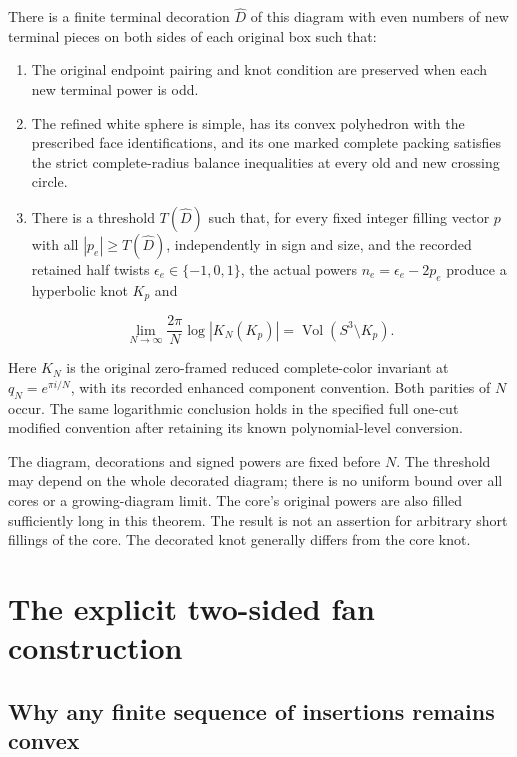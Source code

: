There is a finite terminal decoration \(\widehat D\) of this diagram with even numbers of new terminal pieces on both sides of each original box such that:

\begin{enumerate}
\def\labelenumi{\arabic{enumi}.}

\item
  The original endpoint pairing and knot condition are preserved when each new terminal power is odd.
\item
  The refined white sphere is simple, has its convex polyhedron with the prescribed face identifications, and its one marked complete packing satisfies the strict complete-radius balance inequalities at every old and new crossing circle.
\item
  There is a threshold \(T(\widehat D)\) such that, for every fixed integer filling vector \(p\) with all \(|p_e|\ge T(\widehat D)\), independently in sign and size, and the recorded retained half twists \(\epsilon_e\in\{-1,0,1\}\), the actual powers \(n_e=\epsilon_e-2p_e\) produce a hyperbolic knot \(K_p\) and
\end{enumerate}

\begin{equation}\label{bl:T1}
\lim_{N\to\infty}\frac{2\pi}{N}\log|K_N(K_p)|
       =\operatorname{Vol}(S^3\setminus K_p).
\end{equation}

Here \(K_N\) is the original zero-framed reduced complete-color invariant at \(q_N=e^{\pi i/N}\), with its recorded enhanced component convention. Both parities of \(N\) occur. The same logarithmic conclusion holds in the specified full one-cut modified convention after retaining its known polynomial-level conversion.

The diagram, decorations and signed powers are fixed before \(N\). The threshold may depend on the whole decorated diagram; there is no uniform bound over all cores or a growing-diagram limit. The core's original powers are also filled sufficiently long in this theorem. The result is not an assertion for arbitrary short fillings of the core. The decorated knot generally differs from the core knot.

\section{The explicit two-sided fan construction}\label{bl:the-explicit-two-sided-fan-construction}

\subsection{Why any finite sequence of insertions remains convex}\label{bl:why-any-finite-sequence-of-insertions-remains-convex}

